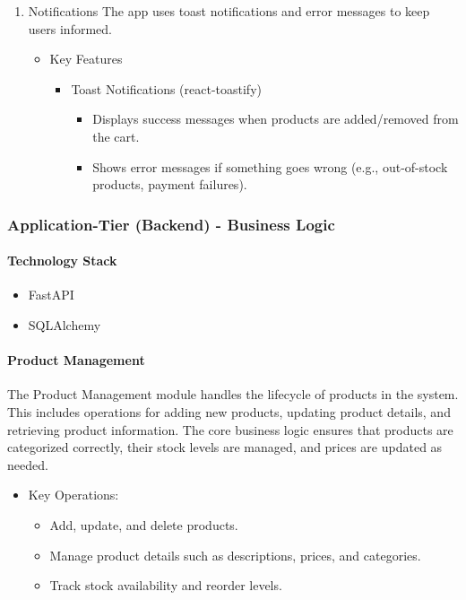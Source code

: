 \documentclass{llncs}
\begin{document}
\begin{enumerate}
    \item Notifications
          The app uses toast notifications and error messages to keep users informed.
          \begin{itemize}
              \item Key Features
                    \begin{itemize}
                        \item Toast Notifications (react-toastify)
                              \begin{itemize}
                                  \item Displays success messages when products are added/removed from the cart.
                                  \item Shows error messages if something goes wrong (e.g., out-of-stock products, payment failures).
                              \end{itemize}
                    \end{itemize}
          \end{itemize}
\end{enumerate}

\subsubsection{Application-Tier (Backend) - Business Logic}
\paragraph{Technology Stack}
\begin{itemize}
    \item FastAPI
    \item SQLAlchemy
\end{itemize}

\paragraph{Product Management} \leavevmode

The Product Management module handles the lifecycle of products in the system. This includes operations for adding new products, updating product details, and retrieving product information. The core business logic ensures that products are categorized correctly, their stock levels are managed, and prices are updated as needed.
\begin{itemize}
    \item Key Operations:
          \begin{itemize}
              \item Add, update, and delete products.
              \item Manage product details such as descriptions, prices, and categories.
              \item Track stock availability and reorder levels.
          \end{itemize}
\end{itemize}
\end{document}
